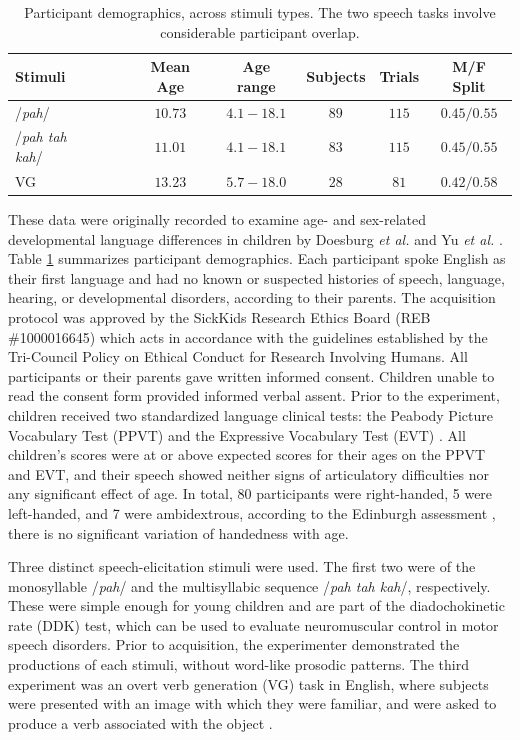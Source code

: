 \documentclass[fleqn,10pt]{wlscirep}
\begin{document}
\begin{table}[h]
  \centering
  \begin{tabular}{ l@{}c c c c c }
    \toprule
    \textbf{Stimuli} & \textbf{Mean Age} & \textbf{Age range} & \textbf{Subjects} & \textbf{Trials}  & \textbf{M/F Split} \\
    \midrule
    /{\em pah}/~~~                    & $10.73$ & $4.1-18.1$   &   $89$   &   $115$   &   $0.45/0.55$ \\
    /{\em pah tah kah}/~~~            & $11.01$ & $4.1-18.1$   &   $83$   &   $115$   &   $0.45/0.55$ \\
    VG~~~                             & $13.23$ & $5.7-18.0$   &   $28$   &   $81$    &   $0.42/0.58$  \\
    \bottomrule
  \end{tabular}
  \caption{Participant demographics, across stimuli types. The two speech tasks involve considerable participant overlap.}
  \label{tab:subjects}
\end{table}
These data were originally recorded to examine age- and sex-related developmental language differences in children by Doesburg {\em et al.} \cite{Doesburg2016} and Yu {\em et al.} \cite{Yu2014}. Table \ref{tab:subjects} summarizes participant demographics. Each participant spoke English as their first language and had no known or suspected histories of speech, language, hearing, or developmental disorders, according to their parents. The acquisition protocol was approved by the SickKids Research Ethics Board (REB \#1000016645) which acts in accordance with the guidelines established by the Tri-Council Policy on Ethical Conduct for Research Involving Humans. All participants or their parents gave written informed consent. Children unable to read the consent form provided informed verbal assent. Prior to the experiment, children received two standardized language clinical tests: the Peabody Picture Vocabulary Test (PPVT) \cite{Dunn97} and the Expressive Vocabulary Test (EVT) \cite{EVT}. All children's scores were at or above expected scores for their ages on the PPVT and EVT, and their speech showed neither signs of articulatory difficulties nor any significant effect of age. In total, 80 participants were right-handed, 5 were left-handed, and 7 were ambidextrous, according to the Edinburgh assessment \cite{Oldfield1971}, there is no significant variation of handedness with age.

Three distinct speech-elicitation stimuli were used. The first two were of the monosyllable /{\em pah}/ and the multisyllabic sequence /{\em pah tah kah}/, respectively. These were simple enough for young children and are part of the diadochokinetic rate (DDK) test, which can be used to evaluate neuromuscular control in motor speech disorders. Prior to acquisition, the experimenter demonstrated the productions of each stimuli, without word-like prosodic patterns. The third experiment was an overt verb generation (VG) task in English, where subjects were presented with an image with which they were familiar, and were asked to produce a verb associated with the object \cite{Doesburg2016}.
\end{document}
